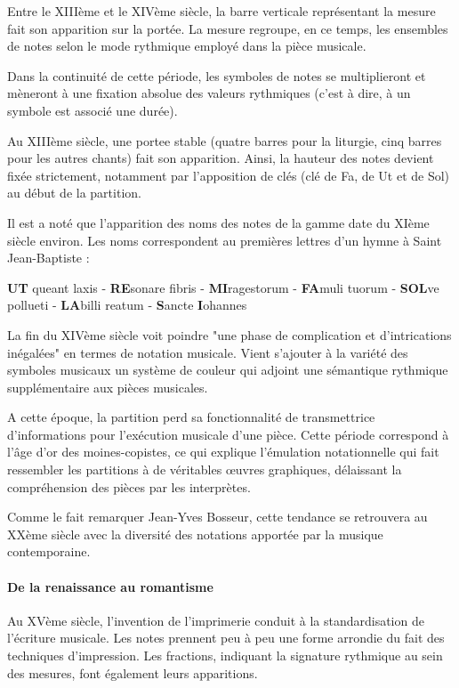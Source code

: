 Entre le XIIIème et le XIVème siècle, la barre verticale représentant la mesure fait son apparition sur la portée. La mesure regroupe, en ce temps, les ensembles de notes selon le mode rythmique employé dans la pièce musicale.

Dans la continuité de cette période, les symboles de notes se multiplieront et mèneront à une fixation absolue des valeurs rythmiques (c'est à dire, à un symbole est associé une durée).

Au XIIIème siècle, une \gls{portee} stable (quatre barres pour la liturgie, cinq barres pour les autres chants) fait son apparition. Ainsi, la hauteur des notes devient fixée strictement, notamment par l'apposition de clés (clé de Fa, de Ut et de Sol) au début de la partition.

Il est a noté que l'apparition des noms des notes de la gamme date du XIème siècle environ. Les noms correspondent au premières lettres d'un hymne à Saint Jean-Baptiste :

\begin{center}
	\textbf{UT} queant laxis - \textbf{RE}sonare fibris - \textbf{MI}ragestorum - \textbf{FA}muli tuorum -  \textbf{SOL}ve pollueti - \textbf{LA}billi reatum - \textbf{S}ancte \textbf{I}ohannes
\end{center}

La fin du XIVème siècle voit poindre "une phase de complication et d'intrications inégalées"\cite{bosseur2005} en termes de notation musicale. Vient s'ajouter à la variété des symboles musicaux un système de couleur qui adjoint une sémantique rythmique supplémentaire aux pièces musicales.

A cette époque, la partition perd sa fonctionnalité de transmettrice d'informations pour l'exécution musicale d'une pièce. Cette période correspond à l'âge d'or des moines-copistes, ce qui explique l'émulation notationnelle qui fait ressembler les partitions à de véritables œuvres graphiques, délaissant la compréhension des pièces par les interprètes.

Comme le fait remarquer Jean-Yves Bosseur, cette tendance se retrouvera au XXème siècle avec la diversité des notations apportée par la musique contemporaine. 
   
\paragraph{De la renaissance au romantisme} Au XVème siècle, l'invention de l'imprimerie conduit à la standardisation de l'écriture musicale. Les notes prennent peu à peu une forme arrondie du fait des techniques d'impression. Les fractions, indiquant la signature rythmique au sein des mesures, font également leurs apparitions. 

